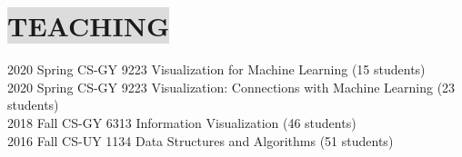 \section*{
    \colorbox{gainsboro}{TEACHING}
}

2020 Spring \hspace{9mm} 
CS-GY 9223 Visualization for Machine Learning (15 students)
\\
2020 Spring \hspace{9mm} 
CS-GY 9223 Visualization: Connections with Machine Learning (23 students)
\\
2018 Fall \hspace{13.5mm} 
CS-GY 6313 Information Visualization (46 students)
\\
2016 Fall \hspace{13.5mm} 
CS-UY 1134 Data Structures and Algorithms (51 students)